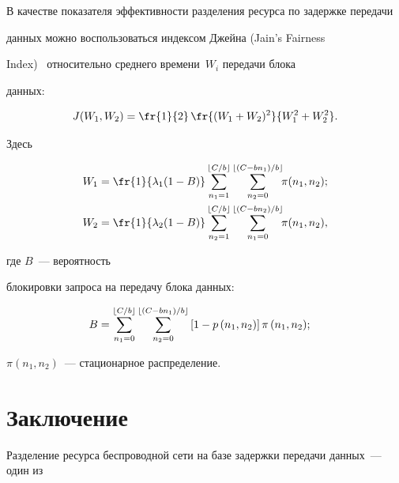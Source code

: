 В качестве показателя эффективности разделения ресурса по задержке передачи 


данных можно воспользоваться индексом Джейна (Jain's Fairness 


Index)~\cite{Jain1984} относительно среднего времени~$W_i$ передачи блока 


данных:


\begin{equation*}


 J(W_1,W_2) = \fr{1}{2} \, \fr{(W_1+W_2)^2}{W_1^2+W_2^2}.


\end{equation*}


Здесь


\begin{align*}


 W_1 &= \fr{1}{\lambda_1(1-B)} \sum\limits_{n_1=1}^{\Cb}{\sum\limits_{n_2=0}^{\lfloor 


(C-bn_1)/b \rfloor}\!\!{\pi(n_1,n_2)}}; \\


 W_2 &= \fr{1}{\lambda_2(1-B)}  \sum\limits_{n_2=1}^{\Cb}{\sum_{n_1=0}^{\lfloor 


(C-bn_2)/b \rfloor}\!\!{\pi(n_1,n_2)}},


\end{align*}


где $B$~--- вероятность 


блокировки запроса на передачу блока данных:


\begin{align*}


& B=\sum_{n_1=0}^{\Cb}{\sum_{n_2=0}^{\lfloor (C-bn_1)/b \rfloor}{\left[1-p\left(n_1,n_2\right)\right] 


 \pi\left(n_1,n_2\right)}};


\end{align*}


$\pi(n_1,n_2)$~--- стационарное распределение.











\section{Заключение}








Разделение ресурса беспроводной сети на базе задержки передачи данных~--- один из 


